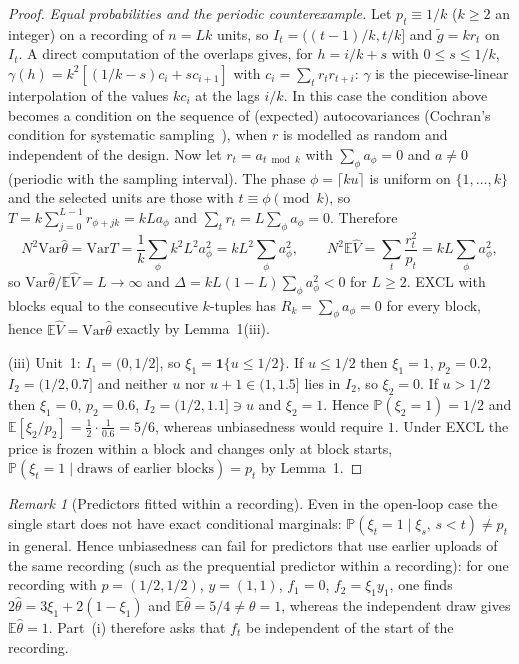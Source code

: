 \documentclass[11pt]{article}
\theoremstyle{remark}
\newtheorem{remark}{Remark}
\newcommand{\E}{\mathbb{E}}
\renewcommand{\Pr}{\mathbb{P}}
\newcommand{\Var}{\mathrm{Var}}
\newcommand{\one}{\mathbf 1}
\newcommand{\hth}{\hat\theta}
\newcommand{\hV}{\hat V}
\begin{document}
\begin{proof}
\emph{Equal probabilities and the periodic counterexample.} Let $p_t\equiv1/k$ ($k\ge2$ an integer) on a recording of $n=Lk$ units, so $I_t=((t-1)/k,t/k]$ and $\tilde g=kr_t$ on $I_t$. A direct computation of the overlaps gives, for $h=i/k+s$ with $0\le s\le1/k$, $\gamma(h)=k^2[(1/k-s)c_i+sc_{i+1}]$ with $c_i=\sum_tr_tr_{t+i}$: $\gamma$ is the piecewise-linear interpolation of the values $kc_i$ at the lags $i/k$. In this case the condition above becomes a condition on the sequence of (expected) autocovariances (Cochran's condition for systematic sampling~\cite{cochran1946}), when $r$ is modelled as random and independent of the design. Now let $r_t=a_{t\bmod k}$ with $\sum_\phi a_\phi=0$ and $a\ne0$ (periodic with the sampling interval). The phase $\phi=\lceil ku\rceil$ is uniform on $\{1,\dots,k\}$ and the selected units are those with $t\equiv\phi\pmod k$, so $T=k\sum_{j=0}^{L-1}r_{\phi+jk}=kLa_\phi$ and $\sum_tr_t=L\sum_\phi a_\phi=0$. Therefore
\[
N^2\Var\hth=\Var T=\frac1k\sum_\phi k^2L^2a_\phi^2=kL^2\sum_\phi a_\phi^2,\qquad N^2\E\hV=\sum_t\frac{r_t^2}{p_t}=kL\sum_\phi a_\phi^2 ,
\]
so $\Var\hth/\E\hV=L\to\infty$ and $\Delta=kL(1-L)\sum_\phi a_\phi^2<0$ for $L\ge2$. EXCL with blocks equal to the consecutive $k$-tuples has $R_k=\sum_\phi a_\phi=0$ for every block, hence $\E\hV=\Var\hth$ exactly by Lemma~1(iii).

(iii) Unit~1: $I_1=(0,1/2]$, so $\xi_1=\one\{u\le1/2\}$. If $u\le1/2$ then $\xi_1=1$, $p_2=0.2$, $I_2=(1/2,0.7]$ and neither $u$ nor $u+1\in(1,1.5]$ lies in $I_2$, so $\xi_2=0$. If $u>1/2$ then $\xi_1=0$, $p_2=0.6$, $I_2=(1/2,1.1]\ni u$ and $\xi_2=1$. Hence $\Pr(\xi_2=1)=1/2$ and $\E[\xi_2/p_2]=\tfrac12\cdot\tfrac1{0.6}=5/6$, whereas unbiasedness would require $1$. Under EXCL the price is frozen within a block and changes only at block starts, $\Pr(\xi_t=1\mid\text{draws of earlier blocks})=p_t$ by Lemma~1.
\end{proof}

\begin{remark}[Predictors fitted within a recording]
Even in the open-loop case the single start does not have exact conditional marginals: $\Pr(\xi_t=1\mid\xi_s,\,s<t)\ne p_t$ in general. Hence unbiasedness can fail for predictors that use earlier uploads of the same recording (such as the prequential predictor within a recording): for one recording with $p=(1/2,1/2)$, $y=(1,1)$, $f_1=0$, $f_2=\xi_1y_1$, one finds $2\hth=3\xi_1+2(1-\xi_1)$ and $\E\hth=5/4\ne\theta=1$, whereas the independent draw gives $\E\hth=1$. Part~(i) therefore asks that $f_t$ be independent of the start of the recording.
\end{remark}
\end{document}

